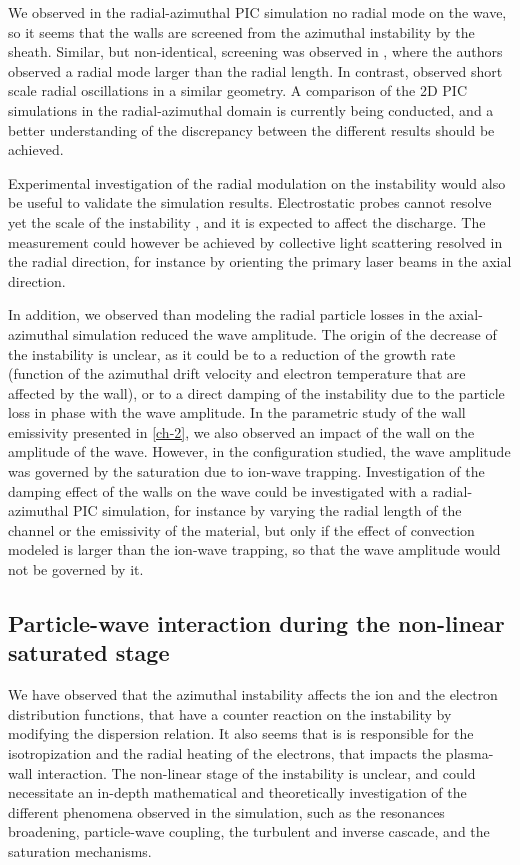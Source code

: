 We observed in the radial-azimuthal PIC simulation no radial mode on the wave, so it seems that the walls are screened from the azimuthal instability by the sheath.
Similar, but non-identical, screening was observed in \citet{janhunen2018}, where the authors observed a radial mode larger than the radial length.
In contrast, \citet{taccogna2019} observed short scale radial oscillations in a similar geometry.
A comparison of the 2D PIC simulations in the radial-azimuthal domain is currently being conducted, and a better understanding of the discrepancy between the different results should be achieved.

Experimental investigation of the radial modulation on the instability would also be useful to validate the simulation results.
Electrostatic probes cannot resolve yet the scale of the instability \citep{brown2018}, and it is expected to affect the discharge.
The measurement could however be achieved by collective light scattering \citep{tsikata2009} resolved in the radial direction, for instance by orienting the primary laser beams in the axial direction.

In addition, we observed than modeling the radial particle losses in the axial-azimuthal simulation reduced the wave amplitude.
The origin of the decrease of the instability is unclear, as it could be to a reduction of the growth rate (function of the azimuthal drift velocity and electron temperature that are affected by the wall), or to a direct damping of the instability due to the particle loss in phase with the wave amplitude.
In the parametric study of the wall emissivity presented in \cref{ch-2}, we also observed an impact of the wall on the amplitude of the wave.
However, in the configuration studied, the  wave amplitude was governed by the saturation due to ion-wave trapping.
Investigation of the damping effect of the walls on the wave could be investigated with a radial-azimuthal PIC simulation, for instance by varying the radial length of the channel or the emissivity of the material, but only if the effect of convection modeled is larger than the ion-wave trapping, so that the wave amplitude would not be governed by it.



\subsection{Particle-wave interaction during the non-linear saturated stage}
We have observed that the azimuthal instability affects the ion and the electron distribution functions, that have a counter reaction on the instability by modifying the dispersion relation.
It also seems that is is responsible for the isotropization  and the radial heating of the electrons, that impacts the plasma-wall interaction.
The non-linear stage of the instability is unclear, and could necessitate an in-depth mathematical and theoretically investigation of the different phenomena observed in the simulation, such as the resonances broadening, particle-wave coupling, the turbulent and inverse cascade, and the saturation mechanisms.

